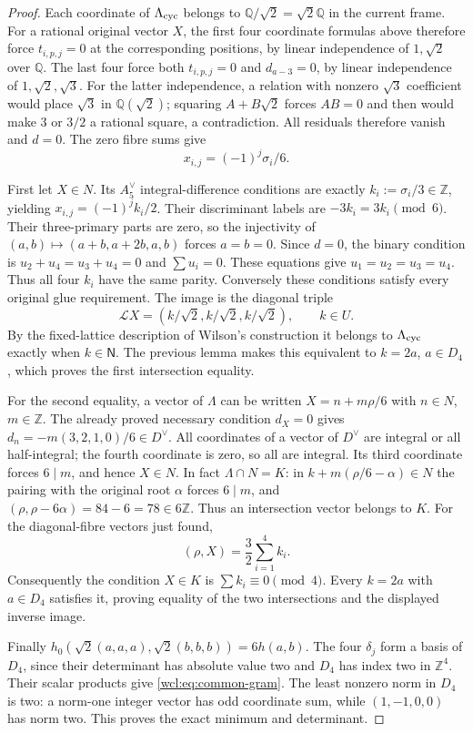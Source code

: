 \begin{proof}
Each coordinate of $\Lambda_{\rm cyc}$ belongs to
$\mathbb Q/\sqrt2=\sqrt2\mathbb Q$ in the current frame.
For a rational original vector $X$, the first four coordinate
formulas above therefore force $t_{i,p,j}=0$ at the corresponding
positions, by linear independence of $1,\sqrt2$ over $\mathbb Q$.
The last four force both $t_{i,p,j}=0$ and $d_{a-3}=0$, by linear
independence of $1,\sqrt2,\sqrt3$. For the latter independence, a
relation with nonzero $\sqrt3$ coefficient would place $\sqrt3$ in
$\mathbb Q(\sqrt2)$; squaring $A+B\sqrt2$ forces $AB=0$ and then
would make $3$ or $3/2$ a rational square, a contradiction.
All residuals therefore vanish and $d=0$. The zero fibre sums give
\[
 x_{i,j}=(-1)^j\sigma_i/6.
\]

First let $X\in N$. Its $A_5^\vee$ integral-difference conditions
are exactly $k_i:=\sigma_i/3\in\mathbb Z$, yielding
$x_{i,j}=(-1)^jk_i/2$. Their discriminant labels are
$-3k_i=3k_i\pmod6$. Their three-primary parts are zero, so the
injectivity of $(a,b)\mapsto(a+b,a+2b,a,b)$ forces $a=b=0$.
Since $d=0$, the binary condition is
$u_2+u_4=u_3+u_4=0$ and $\sum u_i=0$. These equations give
$u_1=u_2=u_3=u_4$. Thus all four $k_i$ have the same parity.
Conversely these conditions satisfy every original glue requirement.
The image is the diagonal triple
\[
 \mathcal LX=(k/\sqrt2,k/\sqrt2,k/\sqrt2),\qquad k\in U.
\]
By the fixed-lattice description of Wilson's construction it
belongs to $\Lambda_{\rm cyc}$ exactly when $k\in\mathsf N$.
The previous lemma makes this equivalent to $k=2a$, $a\in D_4$,
which proves the first intersection equality.

For the second equality, a vector of $\Lambda$ can be written
$X=n+m\rho/6$ with $n\in N$, $m\in\mathbb Z$.
The already proved necessary condition $d_X=0$ gives
$d_n=-m(3,2,1,0)/6\in D^\vee$.
All coordinates of a vector of $D^\vee$ are integral or all
half-integral; the fourth coordinate is zero, so all are integral.
Its third coordinate forces $6\mid m$, and hence $X\in N$.
In fact $\Lambda\cap N=K$: in
$k+m(\rho/6-\alpha)\in N$ the pairing with the original root
$\alpha$ forces $6\mid m$, and
$(\rho,\rho-6\alpha)=84-6=78\in6\mathbb Z$.
Thus an intersection vector belongs to $K$.
For the diagonal-fibre vectors just found,
\[
 (\rho,X)=\frac32\sum_{i=1}^4 k_i.
\]
Consequently the condition $X\in K$ is $\sum k_i\equiv0\pmod4$.
Every $k=2a$ with $a\in D_4$ satisfies it, proving equality of
the two intersections and the displayed inverse image.

Finally
$h_0(\sqrt2(a,a,a),\sqrt2(b,b,b))=6h(a,b)$.
The four $\delta_j$ form a basis of $D_4$, since their determinant
has absolute value two and $D_4$ has index two in $\mathbb Z^4$.
Their scalar products give \eqref{wcl:eq:common-gram}.
The least nonzero norm in $D_4$ is two: a norm-one integer vector
has odd coordinate sum, while $(1,-1,0,0)$ has norm two.
This proves the exact minimum and determinant.
\end{proof}

